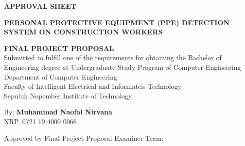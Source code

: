 \begin{center}
  \large
  \textbf{APPROVAL SHEET}
\end{center}

\thispagestyle{empty}

\begin{center}
  \textbf{PERSONAL PROTECTIVE EQUIPMENT (PPE) DETECTION SYSTEM ON CONSTRUCTION WORKERS}
\end{center}

\begingroup
\small

\begin{center}
  \textbf{FINAL PROJECT PROPOSAL} \\
  Submitted to fulfill one of the requirements for obtaining the Bachelor of Engineering degree
  at Undergraduate Study Program of Computer Engineering \\
  Department of Computer Engineering \\
  Faculty of Intelligent Electrical and Informatcis Technology \\
  Sepuluh Nopember Institute of Technology
\end{center}

\begin{center}
  By: \textbf{Muhammad Naofal Nirvana} \\
  NRP. 0721 19 4000 0066
\end{center}

\begin{center}
  Approved by Final Project Proposal Examiner Team:
\end{center}

\begingroup
\setlength{\tabcolsep}{0pt}

